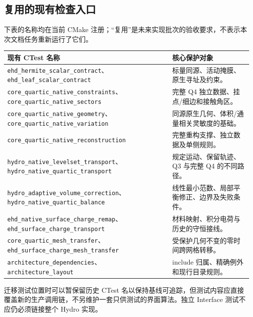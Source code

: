 \documentclass[UTF8,a4paper,11pt,fontset=fandol]{ctexart}
\newcommand{\code}[1]{\nolinkurl{#1}}
\begin{document}
\subsection{复用的现有检查入口}
下表的名称均在当前 CMake 注册；“复用”是未来实现批次的验收要求，不表示本次文档任务重新运行了它们。
\begin{longtable}{@{}P{.42\textwidth}P{.52\textwidth}@{}}
\toprule 现有 CTest 名称 & 核心保护对象\\\midrule\endhead
\code{ehd_hermite_scalar_contract}、\code{ehd_leaf_scalar_contract} & 标量同源、活动掩膜、原生寻址及约束。\\
\code{core_quartic_native_constraints}、\code{core_quartic_native_sectors} & 完整 Q4 独立数据、挂点/细边和接触角区。\\
\code{core_quartic_native_geometry}、\code{core_quartic_native_variation} & 同源原生几何、体积/通量相关灵敏度的基础。\\
\code{core_quartic_native_reconstruction} & 完整重构支撑、独立数据及单侧规则。\\
\code{hydro_native_levelset_transport}、\code{hydro_native_quartic_transport} & 规定运动、保留轨迹、Q3 与完整 Q4 的不同路径。\\
\code{hydro_adaptive_volume_correction}、\code{hydro_native_quartic_balance} & 线性最小范数、局部平衡修正、边界及失败条件。\\
\code{ehd_native_surface_charge_remap}、\code{ehd_surface_charge_transport} & 材料映射、积分电荷与历史的守恒接线。\\
\code{core_quartic_mesh_transfer}、\code{ehd_surface_charge_mesh_transfer} & 受保护几何不变的零时间跨网格转移。\\
\code{architecture_dependencies}、\code{architecture_layout} & include 归属、精确例外和现行目录规则。\\
\bottomrule
\end{longtable}
迁移测试位置时可以暂保留历史 CTest 名以保持基线可追踪，但测试内容应直接覆盖新的生产调用链，不另维护一套只供测试的界面算法。独立 Interface 测试不应仍必须链接整个 Hydro 实现。
\end{document}
